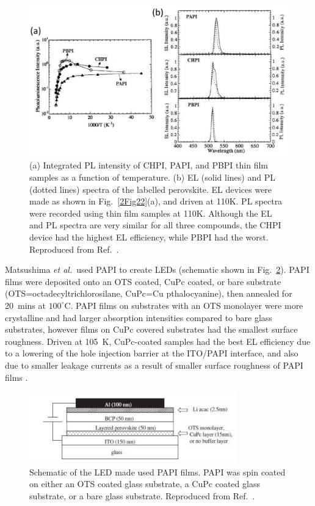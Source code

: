 \begin{figure}[h!]
\centering
\includegraphics[width=\textwidth]{Fig23}
\caption{(a) Integrated PL intensity of CHPI, PAPI, and PBPI thin film samples as a function of temperature. (b) EL (solid lines) and PL (dotted lines) spectra of the labelled perovskite. EL devices were made as shown in Fig.\ \ref{2Fig22}(a), and driven at 110K. PL spectra were recorded using thin film samples at 110K. Although the EL and PL spectra are very similar for all three compounds, the CHPI device had the highest EL efficiency, while PBPI had the worst. Reproduced from Ref.\ \cite{Hattori1996}.}
\label{2Fig23}
\end{figure}

Matsushima \textit{et al.}\ used PAPI to create LEDs (schematic shown in Fig.\ \ref{2Fig24}). PAPI films were deposited onto an OTS coated, CuPc coated, or bare substrate (OTS=octadecyltrichlorosilane, CuPc=Cu pthalocyanine), then annealed for 20~mins at $100^{\circ}$C. PAPI films on substrates with an OTS monolayer were more crystalline and had larger absorption intensities compared to bare glass substrates, however films on CuPc covered substrates had the smallest surface roughness. Driven at 105~K, CuPc-coated samples had the best EL efficiency due to a lowering of the hole injection barrier at the ITO/PAPI interface, and also due to smaller leakage currents as a result of smaller surface roughness of PAPI films \cite{Matsushima2005}.
\begin{figure}[h!]
\centering
\includegraphics[width=0.8\textwidth]{Fig24}
\caption{Schematic of the LED made used PAPI films. PAPI was spin coated on either an OTS coated glass substrate, a CuPc coated glass substrate, or a bare glass substrate. Reproduced from Ref.\ \cite{Matsushima2005}.}
\label{2Fig24}
\end{figure}

